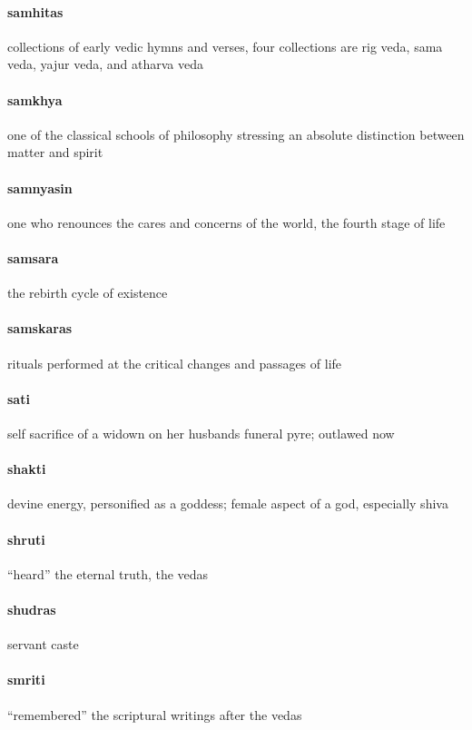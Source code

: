 \documentclass{article}
\begin{document}
\paragraph{samhitas}
\label{par:samhitas}
collections of early vedic hymns and verses, four collections are rig veda, sama veda, yajur veda, and atharva veda
\paragraph{samkhya}
\label{par:samkhya}
one of the classical schools of philosophy stressing an absolute distinction between matter and spirit
\paragraph{samnyasin}
\label{par:samnyasin}
one who renounces the cares and concerns of the world, the fourth stage of life
\paragraph{samsara}
\label{par:samsara}
the rebirth cycle of existence
\paragraph{samskaras}
\label{par:samskaras}
rituals performed at the critical changes and passages of life
\paragraph{sati}
\label{par:sati}
self sacrifice of a widown on her husbands funeral pyre; outlawed now
\paragraph{shakti}
\label{par:shakti}
devine energy, personified as a goddess; female aspect of a god, especially shiva
\paragraph{shruti}
\label{par:shruti}
``heard'' the eternal truth, the vedas
\paragraph{shudras}
\label{par:shudras}
servant caste
\paragraph{smriti}
\label{par:smriti}
``remembered'' the scriptural writings after the vedas
\end{document}
